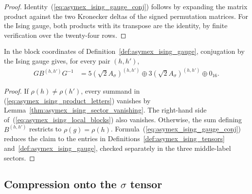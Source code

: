 \begin{proof}
    \leanok
    Identity~(\ref{eq:asymex_ising_gauge_conj}) follows by expanding the
    matrix product against the two Kronecker deltas of the signed
    permutation matrices. For the Ising gauge, both products with its
    transpose are the identity, by finite verification over the
    twenty-four rows.
\end{proof}

\begin{lemma}%
    \label{thm:asymex_ising_letter_identity}
    \leanok
    In the block coordinates of Definition~\ref{def:asymex_ising_gauge},
    conjugation by the Ising gauge gives, for every pair $(h,h')$,
    \begin{align}
        GB^{(h,h')}G^{-1}
         & =5(\sqrt2A_\sigma)^{(h,h')}
        \oplus3(\sqrt2A_\sigma)^{(h,h')}\oplus0_{16}.
        \label{eq:asymex_ising_local_blocks}
    \end{align}
\end{lemma}

\begin{proof}
    \leanok
    If $\rho(h)\neq\rho(h')$, every summand in
    (\ref{eq:asymex_ising_product_letters}) vanishes by
    Lemma~\ref{thm:asymex_ising_sector_vanishing}.
    The right-hand side of~(\ref{eq:asymex_ising_local_blocks}) also
    vanishes. Otherwise, the sum defining $B^{(h,h')}$ restricts to
    $\rho(g)=\rho(h)$. Formula~(\ref{eq:asymex_ising_gauge_conj})
    reduces the claim to the entries in
    Definitions~\ref{def:asymex_ising_tensors}
    and~\ref{def:asymex_ising_gauge}, checked separately in the three
    middle-label sectors.
\end{proof}

\subsection{Compression onto the \texorpdfstring{$\sigma$}{sigma} tensor}%
\label{sec:asymex_ising_compression}

